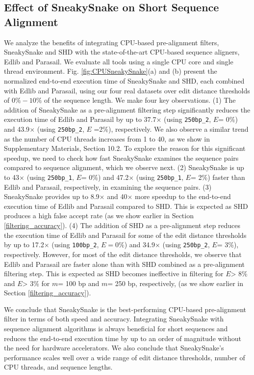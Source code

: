 {\subsection{{Effect} of SneakySnake on Short Sequence Alignment}
We analyze the benefits of integrating CPU-based pre-alignment filters, SneakySnake and SHD with the state-of-the-art CPU-based sequence aligners, Edlib and Parasail. We evaluate all tools using a single CPU core and single thread environment. Fig. \ref{fig:CPUSneakySnake}(a) and (b) present the normalized end-to-end execution time of SneakySnake and SHD{,} each combined with Edlib and Parasail, using our four real datasets over edit distance thresholds of $0\%-10\%$ of the sequence length. We make four key observations. (1) The addition of SneakySnake as a pre-alignment filtering step {significantly} reduces the execution time of Edlib and Parasail by up to 37.7$\times$ (using \texttt{250bp\_2}, $E$= 0\%) and 43.9$\times$ (using \texttt{250bp\_2}, $E$ =2\%), respectively. 
We also observe a similar trend as the number of CPU threads increases from 1 to 40, as we {show} in Supplementary Materials, Section 10.2.
{To explore the reason for this significant speedup, we need to check how fast SneakySnake examines the sequence pairs compared to sequence alignment, which we observe next}.
(2) SneakySnake is up to 43$\times$ (using \texttt{250bp\_1}, $E$= 0\%) and  47.2$\times$ (using \texttt{250bp\_1}, $E$= 2\%) faster than Edlib and Parasail, respectively, in examining the sequence pairs. 
(3) SneakySnake provides up to 8.9$\times$ 
and 40$\times$ 
more speedup to the end-to-end execution time of Edlib and Parasail compared to SHD. This is expected as SHD produces a high false accept rate (as we show earlier in Section \ref{filtering_accuracy}).
(4) The addition of SHD as a pre-alignment step reduces the execution time of Edlib and Parasail for some of the edit distance thresholds by up to 17.2$\times$ (using \texttt{100bp\_2}, $E=0\%$) and 34.9$\times$ (using \texttt{250bp\_2}, $E$= 3\%), respectively. 
However, for most of the edit distance thresholds, we observe that Edlib and Parasail are faster alone than with SHD combined as a pre-alignment filtering step. This is expected as SHD becomes ineffective in filtering for $E$> 8\% and $E$> 3\% for $m$= 100 bp and $m$= 250 bp, respectively, (as we show earlier in Section \ref{filtering_accuracy}).

We conclude that SneakySnake is the best-performing CPU-based pre-alignment filter in terms of both speed and accuracy. Integrating SneakySnake with sequence alignment algorithms is always beneficial for short sequences and reduces the end-to-end execution time by up to an order of magnitude without the need for hardware accelerators. 
We also conclude that SneakySnake's performance {scales well} over a wide range of edit distance thresholds, number of CPU threads, and sequence lengths.


}
